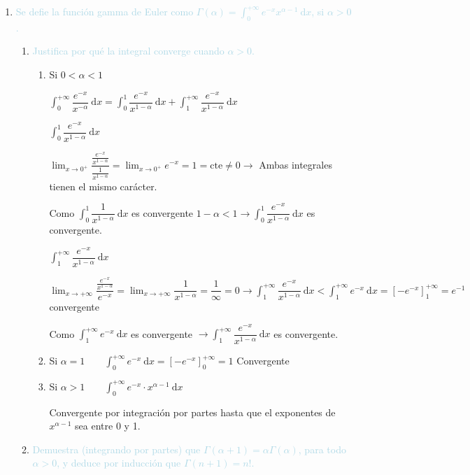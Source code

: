 \documentclass[12pt]{article}
\newcommand{\bboxed}[1]{\fcolorbox{lightblue}{lightblue!10}{$#1$}}
\newcommand{\lb}[1]{\textcolor{lightblue}{#1}}
\newcommand{\dx}{\:\mathrm{d}x}
\begin{document}
\begin{enumerate}[label=\color{red}\textbf{\arabic*}),leftmargin=*, start=27]
\begin{enumerate}[label=\color{red}\alph*)]
      $=\bboxed{\sqrt{\pi}}$
\end{enumerate}
\item \lb{Se defie la función gamma de Euler como $\Gamma(\alpha)=\int_{0}^{+\infty}e^{-x}x^{\alpha-1}\dx$, si $\alpha>0$.}
\begin{enumerate}[label=\color{lightblue}\arabic*)]
      \item \lb{Justifica por qué la integral converge cuando $\alpha>0$.}
      \begin{enumerate}[label=\color{lightblue}\arabic*)]
            \item Si $0<\alpha<1$
            
            $\int_{0}^{+\infty}\dfrac{e^{-x}}{x^{-\alpha}}\dx=\int_0^1\dfrac{e^{-x}}{x^{1-\alpha}}\dx+\int_{1}^{+\infty}\dfrac{e^{-x}}{x^{1-\alpha}}\dx$
            
            $\int_0^1\dfrac{e^{-x}}{x^{1-\alpha}}\dx$
            
            $\lim_{x\to0^+}\dfrac{\frac{e^{-x}}{x^{1-\alpha}}}{\frac{1}{x^{1-\alpha}}}=\lim_{x\to0^+}e^{-x}=1=\mathrm{cte}\neq0\longrightarrow$ Ambas integrales tienen el mismo carácter.
            
            Como $\int_0^1\dfrac{1}{x^{1-\alpha}}\dx$ es convergente $1-\alpha<1\longrightarrow\int_0^1\dfrac{e^{-x}}{x^{1-\alpha}}\dx$ es convergente.
            
            $\int_{1}^{+\infty}\dfrac{e^{-x}}{x^{1-\alpha}}\dx$
            
            $\lim_{x\to+\infty}\dfrac{\frac{e^{-x}}{x^{1-\alpha}}}{e^{-x}}=\lim_{x\to+\infty}\dfrac{1}{x^{1-\alpha}}=\dfrac{1}{\infty}=0\longrightarrow\int_{1}^{+\infty}\dfrac{e^{-x}}{x^{1-\alpha}}\dx<\int_{1}^{+\infty}e^{-x}\dx=\left[-e^{-x}\right]_1^{+\infty}=e^{-1}$ convergente
            
            Como $\int_{1}^{+\infty}e^{-x}\dx$ es convergente $\longrightarrow\int_{1}^{+\infty}\dfrac{e^{-x}}{x^{1-\alpha}}\dx$ es convergente.
            \item Si $\alpha=1\qquad\int_{0}^{+\infty}e^{-x}\dx=\left[-e^{-x}\right]_{0}^{+\infty}=1$ Convergente
            \item Si $\alpha>1\qquad\int_{0}^{+\infty}e^{-x}\cdot x^{\alpha-1}\dx$ 
            
            Convergente por integración por partes hasta que el exponentes de $x^{\alpha-1}$ sea entre 0 y 1.
      \end{enumerate}
      \item \lb{Demuestra (integrando por partes) que $\Gamma(\alpha+1)=\alpha\Gamma(\alpha)$, para todo $\alpha>0$, y deduce por inducción que $\Gamma(n+1)=n!$.}
      

\end{enumerate}
\end{enumerate}
\end{document}

